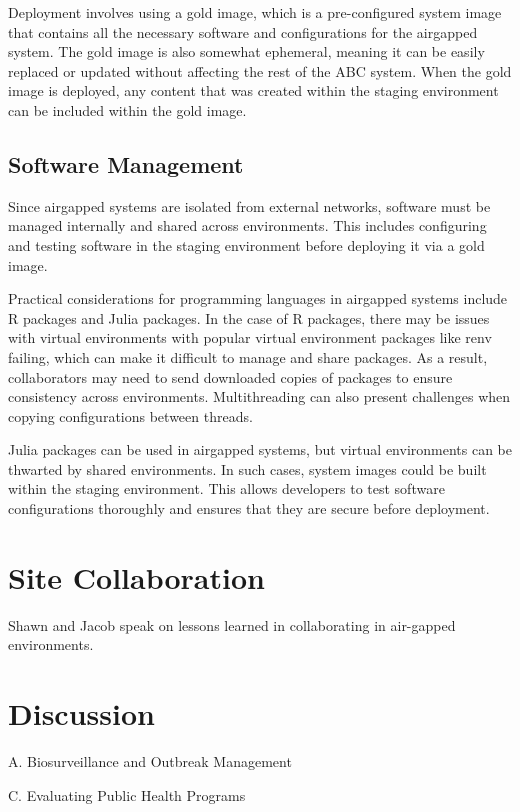 \documentclass{amia}
\begin{document}
Deployment involves using a gold image, which is a pre-configured system image that contains all the necessary software and configurations for the airgapped system. The gold image is also somewhat ephemeral, meaning it can be easily replaced or updated without affecting the rest of the ABC system. When the gold image is deployed, any content that was created within the staging environment can be included within the gold image. 

\subsection*{Software Management}

Since airgapped systems are isolated from external networks, software must be managed internally and shared across environments. This includes configuring and testing software in the staging environment before deploying it via a gold image. 

Practical considerations for programming languages in airgapped systems include R packages and Julia packages. In the case of R packages, there may be issues with virtual environments with popular virtual environment packages like renv failing, which can make it difficult to manage and share packages. As a result, collaborators may need to send downloaded copies of packages to ensure consistency across environments. Multithreading can also present challenges when copying configurations between threads. 

Julia packages can be used in airgapped systems, but virtual environments can be thwarted by shared environments. In such cases, system images could be built within the staging environment. This allows developers to test software configurations thoroughly and ensures that they are secure before deployment. 

\section*{Site Collaboration}

Shawn and Jacob speak on lessons learned in collaborating in air-gapped environments. 

\section*{Discussion}

A. Biosurveillance and Outbreak Management 

C. Evaluating Public Health Programs 
\end{document}
